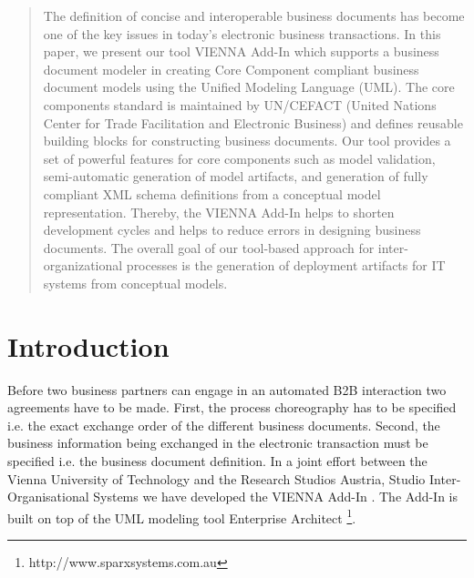 \documentclass{acm_proc_article-sp}
\begin{document}
\maketitle
\begin{abstract}

The definition of concise and interoperable business documents has become one of the key issues in today's electronic business transactions. 
In this paper, we present our tool VIENNA Add-In which supports a business document modeler in creating Core Component compliant business document models using the Unified Modeling Language (UML). The core components standard is maintained by UN/CEFACT (United Nations Center for Trade Facilitation and Electronic Business) and defines reusable building blocks for constructing business documents. 
Our tool provides a set of powerful features for core components such as model validation, semi-automatic generation of model artifacts, and generation of fully compliant XML schema definitions from a conceptual model representation. Thereby, the VIENNA Add-In helps to shorten development cycles and helps to reduce errors in designing business documents. The overall goal of our tool-based approach for inter-organizational processes is the generation of deployment artifacts for IT systems from conceptual models.


\end{abstract}





\section{Introduction}

Before two business partners can engage in an automated B2B interaction two agreements have to be made. First, the process choreography has to be specified i.e. the exact exchange order of the different business documents. Second, the business information being exchanged in the electronic transaction must be specified i.e. the business document definition. In a joint effort between the Vienna University of Technology and the Research Studios Austria, Studio Inter-Organisational Systems we have developed the VIENNA Add-In \cite{man:VIENNAAddIn}. The Add-In is built on top of the UML modeling tool Enterprise Architect \footnote{http://www.sparxsystems.com.au}.
\end{document}

